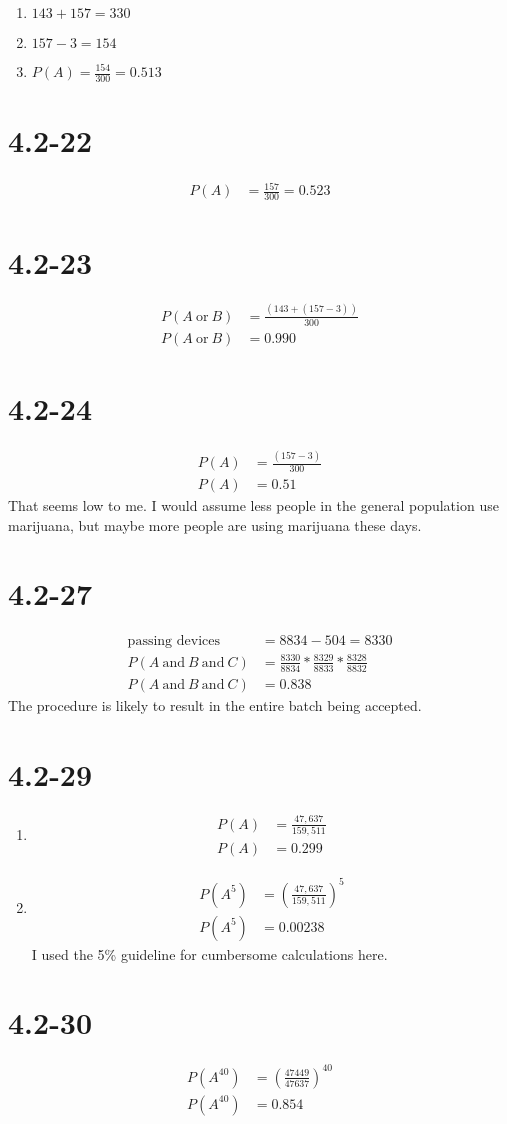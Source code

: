 \documentclass[12pt,fleqn]{article}
\newcommand{\chapter}{4.2}
\newcommand{\problem}[1]{\vspace{5ex}\section*{\chapter-#1}}
\begin{document}
\begin{enumerate}[label=\alph*.]
  \item $143 + 157 = 330$
  \item $157 - 3 = 154$
  \item $P(A) = \frac{154}{300} = 0.513$
\end{enumerate}


\problem{22}
\begin{align*}
  P(A) &= \frac{157}{300} = 0.523
\end{align*}


\problem{23}
\begin{align*}
  P(A~\text{or}~B) &= \frac{(143 + (157 - 3))}{300} \\
  P(A~\text{or}~B) &= 0.990
\end{align*}


\problem{24}
\begin{align*}
  P(A) &= \frac{(157 - 3)}{300} \\
  P(A) &= 0.51
\end{align*}
That seems low to me. I would assume less people in the general population use marijuana, but maybe more people are using marijuana these days.

\problem{27}
\begin{align*}
  \text{passing devices} &= 8834 - 504 = 8330 \\
  P(A~\text{and}~B~\text{and}~C) &= \frac{8330}{8834} * \frac{8329}{8833} * \frac{8328}{8832} \\
  P(A~\text{and}~B~\text{and}~C) &= 0.838
\end{align*}
The procedure is likely to result in the entire batch being accepted.


\problem{29}
\begin{enumerate}[label=\alph*.]
\item
  \begin{align*}
    P(A) &= \frac{47,637}{159,511} \\
    P(A) &= 0.299
  \end{align*}
\item
  \begin{align*}
    P(A^5) &= {\left(\frac{47,637}{159,511}\right)}^5  \\
    P(A^5) &= 0.00238
  \end{align*}
  I used the 5\% guideline for cumbersome calculations here.
\end{enumerate}


\problem{30}
\begin{align*}
  P(A^{40}) &= {\left(\frac{47449}{47637}\right)}^{40} \\
  P(A^{40}) &= 0.854
\end{align*}
\end{document}
